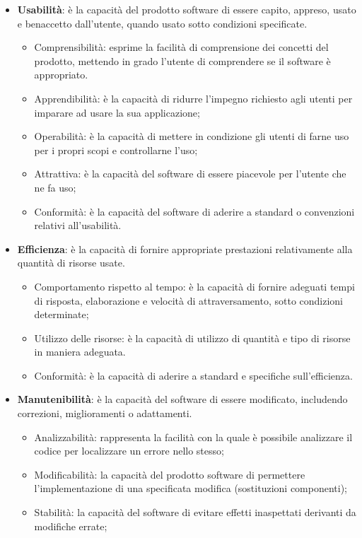 \begin{itemize}
\begin{itemize}
\end{itemize}
\item \textbf{Usabilità}: è la capacità del prodotto software di essere capito, appreso, usato e benaccetto dall'utente, quando usato sotto condizioni specificate.
\begin{itemize}
\item Comprensibilità: esprime la facilità di comprensione dei concetti del prodotto, mettendo in grado l'utente di comprendere se il software è appropriato.
\item Apprendibilità: è la capacità di ridurre l’impegno richiesto agli utenti per imparare ad usare la sua applicazione;
\item Operabilità: è la capacità di mettere in condizione gli utenti di farne uso per i propri scopi e controllarne l’uso;
\item Attrattiva: è la capacità del software di essere piacevole per l'utente che ne fa uso;
\item Conformità: è la capacità del software di aderire a standard o convenzioni relativi all'usabilità.
\end{itemize}
\item \textbf{Efficienza}: è la capacità di fornire appropriate prestazioni relativamente alla quantità di risorse usate.
\begin{itemize}
\item Comportamento rispetto al tempo: è la capacità di fornire adeguati tempi di risposta, elaborazione e velocità di attraversamento, sotto condizioni determinate;
\item Utilizzo delle risorse: è la capacità di utilizzo di quantità e tipo di risorse in maniera adeguata.
\item Conformità: è la capacità di aderire a standard e specifiche sull'efficienza.
\end{itemize}
\item \textbf{Manutenibilità}: è la capacità del software di essere modificato, includendo correzioni, miglioramenti o adattamenti.
\begin{itemize}
\item Analizzabilità: rappresenta la facilità con la quale è possibile analizzare il codice per localizzare un errore nello stesso;
\item Modificabilità: la capacità del prodotto software di permettere l'implementazione di una specificata modifica (sostituzioni componenti);
\item Stabilità: la capacità del software di evitare effetti inaspettati derivanti da modifiche errate;

\end{itemize}
\end{itemize}
